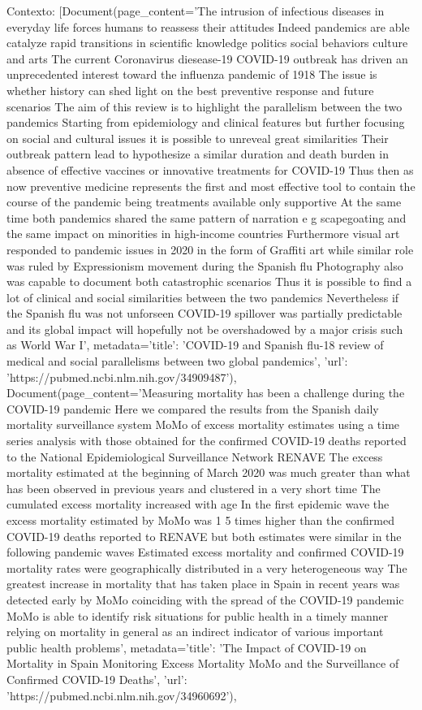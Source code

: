 Contexto: [Document(page\_content='The intrusion of infectious diseases in everyday life forces humans to reassess their attitudes Indeed pandemics are able catalyze rapid transitions in scientific knowledge politics social behaviors culture and arts The current Coronavirus diesease-19 COVID-19 outbreak has driven an unprecedented interest toward the influenza pandemic of 1918 The issue is whether history can shed light on the best preventive response and future scenarios The aim of this review is to highlight the parallelism between the two pandemics Starting from epidemiology and clinical features but further focusing on social and cultural issues it is possible to unreveal great similarities Their outbreak pattern lead to hypothesize a similar duration and death burden in absence of effective vaccines or innovative treatments for COVID-19 Thus then as now preventive medicine represents the first and most effective tool to contain the course of the pandemic being treatments available only supportive At the same time both pandemics shared the same pattern of narration e g scapegoating and the same impact on minorities in high-income countries Furthermore visual art responded to pandemic issues in 2020 in the form of Graffiti art while similar role was ruled by Expressionism movement during the Spanish flu Photography also was capable to document both catastrophic scenarios Thus it is possible to find a lot of clinical and social similarities between the two pandemics Nevertheless if the Spanish flu was not unforseen COVID-19 spillover was partially predictable and its global impact will hopefully not be overshadowed by a major crisis such as World War I', metadata={'title': 'COVID-19 and Spanish flu-18 review of medical and social parallelisms between two global pandemics', 'url': 'https://pubmed.ncbi.nlm.nih.gov/34909487'}), Document(page\_content='Measuring mortality has been a challenge during the COVID-19 pandemic Here we compared the results from the Spanish daily mortality surveillance system MoMo of excess mortality estimates using a time series analysis with those obtained for the confirmed COVID-19 deaths reported to the National Epidemiological Surveillance Network RENAVE The excess mortality estimated at the beginning of March 2020 was much greater than what has been observed in previous years and clustered in a very short time The cumulated excess mortality increased with age In the first epidemic wave the excess mortality estimated by MoMo was 1 5 times higher than the confirmed COVID-19 deaths reported to RENAVE but both estimates were similar in the following pandemic waves Estimated excess mortality and confirmed COVID-19 mortality rates were geographically distributed in a very heterogeneous way The greatest increase in mortality that has taken place in Spain in recent years was detected early by MoMo coinciding with the spread of the COVID-19 pandemic MoMo is able to identify risk situations for public health in a timely manner relying on mortality in general as an indirect indicator of various important public health problems', metadata={'title': 'The Impact of COVID-19 on Mortality in Spain Monitoring Excess Mortality MoMo and the Surveillance of Confirmed COVID-19 Deaths', 'url': 'https://pubmed.ncbi.nlm.nih.gov/34960692'}), 